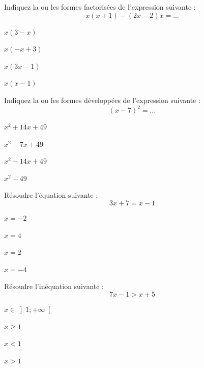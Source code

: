 \documentclass[a4paper,10pt]{article}
\begin{document}
\begin{qcm}
	\q{} Indiquez la ou les formes factorisées de l'expression suivante : $$x(x+1)-(2x-2)x=...$$
	\begin{choix2col}
		\item $x(3-x)$
		\item $x(-x+3)$
		\item $x(3x-1)$
		\item $x(x-1)$
	\end{choix2col}

	\espace

	\q{} Indiquez la ou les formes développées de l'expression suivante : $$(x-7)^2=...$$
	\begin{choix2col}
		\item $x^2+14x+49$
		\item $x^2-7x+49$
		\item $x^2-14x+49$
		\item $x^2-49$
	\end{choix2col}

	\q{} Résoudre l'équation suivante : $$3x+7=x-1$$
	\begin{choix2col}
		\item $x=-2$
		\item $x=4$
		\item $x=2$
		\item $x=-4$
	\end{choix2col}

	\q{} Résoudre l'inéquation suivante : $$7x-1>x+5$$
	\begin{choix2col}
		\item $x\in\left]1;+\infty\right[$
		\item $x\geq 1$
		\item $x<1$
		\item $x>1$
	\end{choix2col}
\end{qcm}
\end{document}
